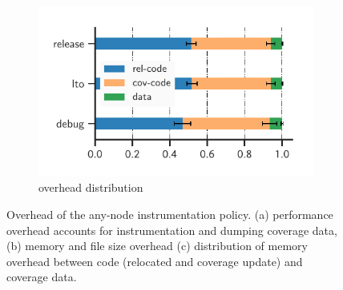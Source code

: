 \begin{figure}[t!]
	\hspace{10pt}
	\begin{subfigure}[t]{0.3\textwidth}
		\includegraphics[clip, trim=0.48cm 0.36cm 0.75cm 0.65cm, width=\textwidth]{fig/overhead-dist}
		\caption{overhead distribution}
		\label{fig:overhead-dist}
	\end{subfigure}
	
	\caption{Overhead of the any-node instrumentation policy. (a) performance overhead accounts for instrumentation and dumping coverage data, (b) memory and file size overhead (c) distribution of memory overhead between code (relocated  and coverage update) and coverage data. }
	\label{fig:overhead-results}
\end{figure}




